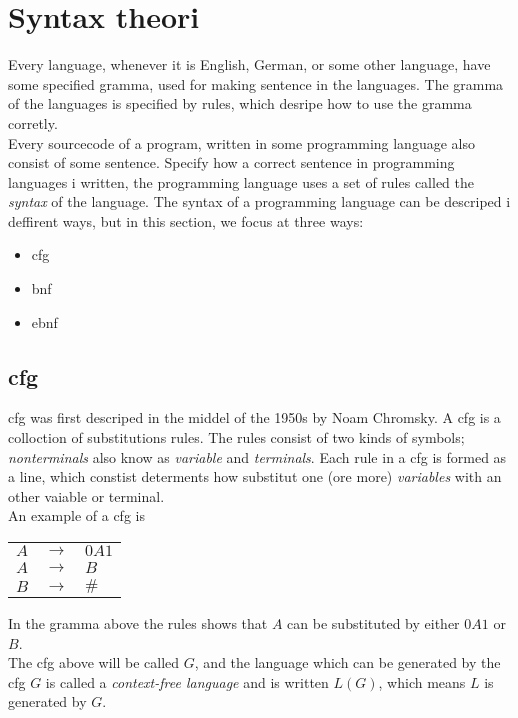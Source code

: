 \pagebreak
\section{Syntax theori}
Every language, whenever it is English, German, or some other language, have some specified gramma, used for making sentence in the languages. The gramma of the languages is specified by rules, which desripe how to use the gramma corretly.   \\
Every sourcecode of a program, written in some programming language also consist of some sentence. Specify how a correct sentence in programming languages i written, the programming language uses a set of rules called the \textit{syntax} of the language. The syntax of a programming language can be descriped i deffirent ways, but in this section, we focus at three ways:
\begin{itemize}
\item{\ac{cfg}}
\item{\ac{bnf}}
\item{\ac{ebnf}}
\end{itemize}

\subsection{\ac{cfg}}
\ac{cfg} was first descriped in the middel of the 1950s by Noam Chromsky. A \ac{cfg} is a colloction of substitutions rules. The rules consist of two kinds of symbols; \textit{nonterminals} also know as \textit{variable} and \textit{terminals}. Each rule in a \ac{cfg} is formed as a line, which constist determents how substitut one (ore more) \textit{variables} with an other vaiable or terminal. \\
An example of a \ac{cfg} is 

\begin{tabular}{l l l}
$A$ & $\rightarrow$ & $0A1$ \\
$A$ & $\rightarrow$ & $B$ \\
$B$ & $\rightarrow$ & $\#$ \\
\end{tabular}

In the gramma above the rules shows that $A$ can be substituted by either $0A1$ or $B$. \\
The \ac{cfg} above will be called $G$, and the language which can be generated by the \ac{cfg} $G$ is called a \textit{context-free language} and is written $L(G)$, which means $L$ is generated by $G$.


